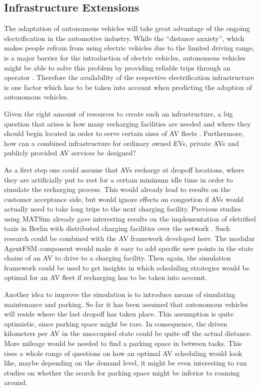 \subsection{Infrastructure Extensions}

The adaptation of autonomous vehicles will take great advantage of the ongoing electrification in
the automotive industry. While the ``distance anxiety'', which makes people refrain
from using electric vehicles due to the limited driving range, is a major barrier
for the introduction of electric vehicles, autonomous vehicles might be able to
solve this problem by providing reliable trips through an operator \citep{Burmeister2016, Chen16}. Therefore
the availability of the respective electrification infrastructure is one factor which has to be taken
into account when predicting the adaption of autonomous vehicles.

Given the right amount of resources to create such an infrastructure, a big question
that arises is how many recharging facilities are needed and where they should begin
located in order to serve certain sizes of AV fleets \citep{Chen2015}. Furthermore, how can a combined
infrastructure for ordinary owned EVs, private AVs and publicly provided AV services
be designed?

As a first step one could assume that AVs recharge at dropoff locations, where they
are artificially put to rest for a certain minimum idle time in order to simulate
the recharging process. This would already lead to results on the customer acceptance
side, but would ignore effects on congestion if AVs would actually need to take long
trips to the next charging facility. Previous studies using MATSim already gave interesting results on the implementation
of eletrified taxis in Berlin with distributed charging facilities
over the network \citep{Bischoff2014}. Such research could be combined with the AV framework developed here.
The modular AgentFSM component would make it easy to add specific new points in the
state chains of an AV to drive to a charging facility. Then again, the simulation framework could be used to get insights in which scheduling
strategies would be optimal for an AV fleet if recharging has to be taken into account.

Another idea to improve the simulation is to introduce means of simulating maintenance
and parking. So far it has been assumed that autonomous vehicles will reside where the last
dropoff has taken place. This assumption is
quite optimistic, since parking space might be rare. In consequence, the driven
kilometers per AV in the unoccupied state could be quite off the actual distance.
More mileage would be needed to find a parking space in between tasks.
This rises a whole range of questions on how an optimal AV scheduling would
look like, maybe depending on the demand level, it might be even interesting to
run  studies on whether the search for parking space might be inferior
to roaming around.

